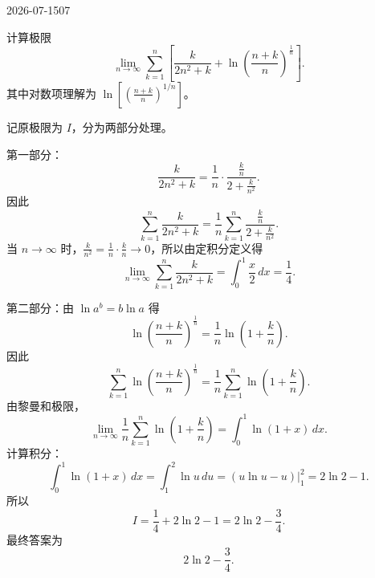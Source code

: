 \begin{mistake}{2026-07-15}{07}

\begin{problemcontent}
计算极限
\[
\lim_{n\to\infty}\sum_{k=1}^{n}\left[
\frac{k}{2n^2+k}
+\ln\left(\frac{n+k}{n}\right)^{\frac1n}
\right].
\]
其中对数项理解为 \(\ln\left[\left(\frac{n+k}{n}\right)^{1/n}\right]\)。
\end{problemcontent}

\begin{solutioncontent}
记原极限为 \(I\)，分为两部分处理。

第一部分：
\[
\frac{k}{2n^2+k}
=\frac{1}{n}\cdot \frac{\frac{k}{n}}{2+\frac{k}{n^2}}.
\]
因此
\[
\sum_{k=1}^{n}\frac{k}{2n^2+k}
=\frac{1}{n}\sum_{k=1}^{n}\frac{\frac{k}{n}}{2+\frac{k}{n^2}}.
\]
当 \(n\to\infty\) 时，\(\frac{k}{n^2}=\frac{1}{n}\cdot\frac{k}{n}\to 0\)，所以由定积分定义得
\[
\lim_{n\to\infty}\sum_{k=1}^{n}\frac{k}{2n^2+k}
=\int_0^1 \frac{x}{2}\,dx
=\frac14.
\]

第二部分：由 \(\ln a^b=b\ln a\) 得
\[
\ln\left(\frac{n+k}{n}\right)^{\frac1n}
=\frac1n\ln\left(1+\frac{k}{n}\right).
\]
因此
\[
\sum_{k=1}^{n}\ln\left(\frac{n+k}{n}\right)^{\frac1n}
=\frac1n\sum_{k=1}^{n}\ln\left(1+\frac{k}{n}\right).
\]
由黎曼和极限，
\[
\lim_{n\to\infty}\frac1n\sum_{k=1}^{n}\ln\left(1+\frac{k}{n}\right)
=\int_0^1\ln(1+x)\,dx.
\]
计算积分：
\[
\int_0^1\ln(1+x)\,dx
=\int_1^2\ln u\,du
=\left(u\ln u-u\right)\bigg|_1^2
=2\ln2-1.
\]
所以
\[
I=\frac14+2\ln2-1=2\ln2-\frac34.
\]
最终答案为
\[
\boxed{2\ln2-\frac34}.
\]
\end{solutioncontent}


\end{mistake}
